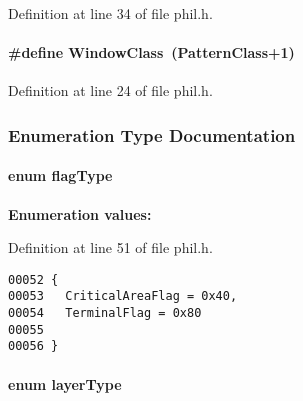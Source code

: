 Definition at line 34 of file phil.h.\label{phil.h_a4}
\paragraph{\setlength{\rightskip}{0pt plus 5cm}\#define Window\-Class\ (Pattern\-Class+1)}\hfill



Definition at line 24 of file phil.h.

\subsubsection{Enumeration Type Documentation}
\label{phil.h_a26}
\paragraph{\setlength{\rightskip}{0pt plus 5cm}enum flag\-Type}\hfill

\begin{Desc}
\item[{\bf Enumeration values:}]\par
\begin{description}
\item[
\label{phil.h_a23}
{\em Critical\-Area\-Flag}]\item[
\label{phil.h_a24}
{\em Terminal\-Flag}]\end{description}
\end{Desc}



Definition at line 51 of file phil.h.\small\begin{verbatim}00052 {
00053   CriticalAreaFlag = 0x40,
00054   TerminalFlag = 0x80
00055 
00056 }
\end{verbatim}\normalsize 
\label{phil.h_a25}
\paragraph{\setlength{\rightskip}{0pt plus 5cm}enum layer\-Type}\hfill

